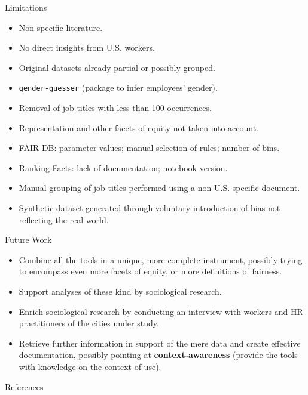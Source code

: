 \documentclass[usenames,dvipsnames]{beamer}
\begin{document}
    
    \begin{frame}{Limitations}
        \begin{itemize}
            \item Non-specific literature.
            \item No direct insights from U.S. workers.
            \item Original datasets already partial or possibly grouped.
            \item \texttt{gender-guesser} (package to infer employees' gender).
            \item Removal of job titles with less than 100 occurrences.
            \item Representation and other facets of equity not taken into account.
            \item FAIR-DB: parameter values; manual selection of rules; number of bins.
            \item Ranking Facts: lack of documentation; notebook version.
            \item Manual grouping of job titles performed using a non-U.S.-specific document.
            \item Synthetic dataset generated through voluntary introduction of bias not reflecting the real world.
        \end{itemize}
    \end{frame}
    
    
    \begin{frame}{Future Work}
        \begin{itemize}
            \item Combine all the tools in a unique, more complete instrument, possibly trying to encompass even more facets of equity, or more definitions of fairness.
            \item Support analyses of these kind by sociological research.
            \item Enrich sociological research by conducting an interview with workers and HR practitioners of the cities under study.
            \item Retrieve further information in support of the mere data and create effective documentation, possibly pointing at \textbf{context-awareness} (provide the tools with knowledge on the context of use).
        \end{itemize}
    \end{frame}
    
    
    \begin{frame}[allowframebreaks]{References}
        \printbibliography
    \end{frame}
\end{document}

